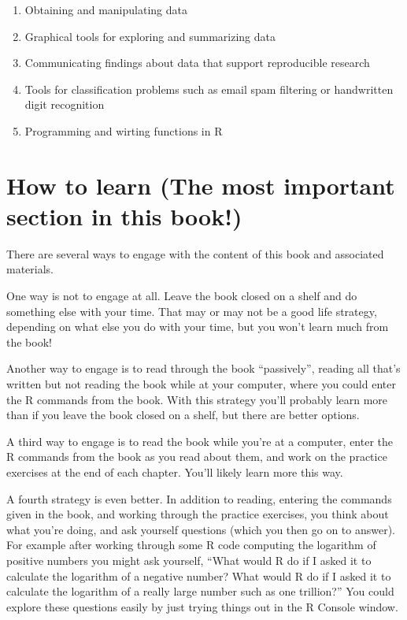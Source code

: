 \documentclass[]{krantz}
\providecommand{\tightlist}{%
  \setlength{\itemsep}{0pt}\setlength{\parskip}{0pt}}
\begin{document}
\begin{enumerate}
\def\labelenumi{\arabic{enumi}.}
\tightlist
\item
  Obtaining and manipulating data
\item
  Graphical tools for exploring and summarizing data
\item
  Communicating findings about data that support reproducible research
\item
  Tools for classification problems such as email spam filtering or
  handwritten digit recognition
\item
  Programming and wirting functions in R
\end{enumerate}

\section{How to learn (The most important section in this
book!)}\label{how-to-learn-the-most-important-section-in-this-book}

There are several ways to engage with the content of this book and
associated materials.

One way is not to engage at all. Leave the book closed on a shelf and do
something else with your time. That may or may not be a good life
strategy, depending on what else you do with your time, but you won't
learn much from the book!

Another way to engage is to read through the book ``passively'', reading
all that's written but not reading the book while at your computer,
where you could enter the R commands from the book. With this strategy
you'll probably learn more than if you leave the book closed on a shelf,
but there are better options.

A third way to engage is to read the book while you're at a computer,
enter the R commands from the book as you read about them, and work on
the practice exercises at the end of each chapter. You'll likely learn
more this way.

A fourth strategy is even better. In addition to reading, entering the
commands given in the book, and working through the practice exercises,
you think about what you're doing, and ask yourself questions (which you
then go on to answer). For example after working through some R code
computing the logarithm of positive numbers you might ask yourself,
``What would R do if I asked it to calculate the logarithm of a negative
number? What would R do if I asked it to calculate the logarithm of a
really large number such as one trillion?'' You could explore these
questions easily by just trying things out in the R Console window.
\end{document}
